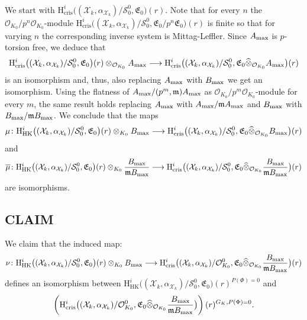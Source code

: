 \documentclass[asterisque,english]{smfart}
\begin{document}
\

We start with  $\mathrm{H}^i_{\mathrm{cris}}\bigl((\mathcal{X}_k,\alpha_{\mathcal{X}_k})/\mathcal{S}_0^0, \mathfrak{E}_0\bigr)(r)$. Note that for every $n$  the  $\mathcal{O}_{K_0}/p^n \mathcal{O}_{K_0}$-module $\mathrm{H}^i_{\mathrm{cris}}\bigl((\mathcal{X}_k,\alpha_{\mathcal{X}_k})/\mathcal{S}_0^0, \mathfrak{E}_0/p^n \mathfrak{E}_0\bigr)(r)$ is finite so that for varying $n$ the corresponding inverse system is Mittag-Leffler.  Since $A_{\rm max}$ is $p$-torsion free, we deduce that $$\mathrm{H}^i_{\mathrm{cris}}\bigl((\mathcal{X}_k,\alpha_{\mathcal{X}_k})/\mathcal{S}_0^0,  \mathfrak{E}_0\bigr) (r) \otimes_{\mathcal{O}_{K_0}} A_{\rm max}\longrightarrow
\mathrm{H}^i_{\mathrm{cris}}\bigl((\mathcal{X}_k,\alpha_{\mathcal{X}_k})/\mathcal{S}_0^0, \mathfrak{E}_0 \widehat{\otimes}_{\mathcal{O}_{K_0}}  A_{\rm max}\bigr)(r)$$is an isomorphism and,  thus, also replacing $ A_{\rm max}$ with $B_{\rm max} $ we get an isomorphism. Using the flatness of $A_{\rm max}/(p^m,\mathfrak{m}) A_{\rm max}$ as $\mathcal{O}_{K_0}/p^m \mathcal{O}_{K_0}$-module for every $m$, the same result holds replacing $ A_{\rm max}$ with $A_{\rm max} /\mathfrak{m} A_{\rm max}$ and $ B_{\rm max}$ with $B_{\rm max} /\mathfrak{m} B_{\rm max}$. We conclude that the maps
$$\mu\colon \mathrm{H}^i_{\mathrm{HK}}\bigl((\mathcal{X}_k,\alpha_{\mathcal{X}_k})/ \mathcal{S}_0^0, \mathfrak{E}_0\bigr)(r)\otimes_{K_0}  B_{\rm max}\longrightarrow \mathrm{H}^i_{\mathrm{cris}}\bigl((\mathcal{X}_k,\alpha_{\mathcal{X}_k})/\mathcal{S}_0^0,\mathfrak{E}_0 \widehat{\otimes}_{\mathcal{O}_{K_0}}  B_{\rm max}\bigr)(r)$$and
 $$\overline{\mu}\colon \mathrm{H}^i_{\mathrm{HK}}\bigl((\mathcal{X}_k,\alpha_{\mathcal{X}_k})/ \mathcal{S}_0^0, \mathfrak{E}_0\bigr)(r)\otimes_{K_0}  \frac{B_{\rm max}}{\mathfrak{m} B_{\rm max}}\longrightarrow \mathrm{H}^i_{\mathrm{cris}}\bigl((\mathcal{X}_k,\alpha_{\mathcal{X}_k})/\mathcal{S}_0^0,\mathfrak{E}_0 \widehat{\otimes}_{\mathcal{O}_{K_0}}  \frac{B_{\rm max}}{\mathfrak{m} B_{\rm max}}\bigr)(r)$$are isomorphisms. 



\subsection{CLAIM} We claim that the induced map:
$$\nu\colon \mathrm{H}^i_{\mathrm{HK}}\bigl((\mathcal{X}_k,\alpha_{\mathcal{X}_k})/ \mathcal{S}_0^0, \mathfrak{E}_0\bigr)(r) \otimes_{K_0} B_{\rm max} \longrightarrow \mathrm{H}^i_{\mathrm{cris}}\bigl((\mathcal{X}_k,\alpha_{\mathcal{X}_k})/\mathcal{O}_{K_0}^0,\mathfrak{E}_0 \widehat{\otimes}_{\mathcal{O}_{K_0}}  \frac{B_{\rm max}}{\mathfrak{m} B_{\rm max}}\bigr)(r)$$defines an isomorphism between
$\mathrm{H}^i_{\mathrm{HK}}\bigl((\mathcal{X}_k,\alpha_{\mathcal{X}_k})/ \mathcal{S}_0^0, \mathfrak{E}_0\bigr)(r)^{P(\Phi)=0}$ and  $$\left(\mathrm{H}^i_{\mathrm{cris}}\bigl((\mathcal{X}_k,\alpha_{\mathcal{X}_k})/\mathcal{O}_{K_0}^0,\mathfrak{E}_0 \widehat{\otimes}_{\mathcal{O}_{K_0}}  \frac{B_{\rm max}}{\mathfrak{m} B_{\rm max}}\bigr)\right)(r)^{G_K,P(\Phi)=0}.$$
\end{document}

